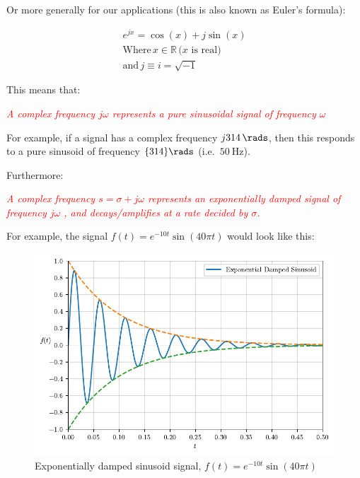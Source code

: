 \documentclass[
  12pt,
  a4paper,
]{report}
\begin{document}
Or more generally for our applications (this is also known as Euler's
formula):

\begin{gather}
    \label{eq:de-moivre-formula-general}
    e^{jx} = \cos(x) + j \sin(x) \\
    \text{Where} \, x \in \mathbb{R}\, \text{(\(x\) is real)} \\
    \text{and} \, j \equiv i = \sqrt{-1}
\end{gather}

This means that:\\
\begin{mdframed}
    \begin{center}
        \textcolor{red}{\emph{A complex frequency \(j\omega \) represents a pure sinusoidal signal of frequency \(\omega \) \unit{\rads}}}
    \end{center}
\end{mdframed}

For example, if a signal has a complex frequency
\(\complexqty[output-complex-root=j, complex-root-position=before-number]{314i}{\rads}\),
then this responds to a pure sinusoid of frequency \(\qty{314}{\rads}\)
(i.e.~\(\qty{50}{\hertz}\)).

Furthermore:\\
\begin{mdframed}
    \begin{center}
        \textcolor{red}{\emph{A complex frequency \(s = \sigma + j\omega\) represents an exponentially damped signal of frequency \(j\omega\) \unit{\rads}, and decays/amplifies at a rate decided by \(\sigma\).}}
    \end{center}
\end{mdframed}

For example, the signal \(f(t) =  e^{-10t} \sin(40\pi t)\) would look
like this:

\begin{figure}

{\centering \includegraphics{index_files/figure-pdf/exp-damped-sinusoid-output-1.pdf}

}

\caption{Exponentially damped sinusoid signal,
\(f(t) =  e^{-10t} \sin(40\pi t)\)}

\end{figure}%
\end{document}
